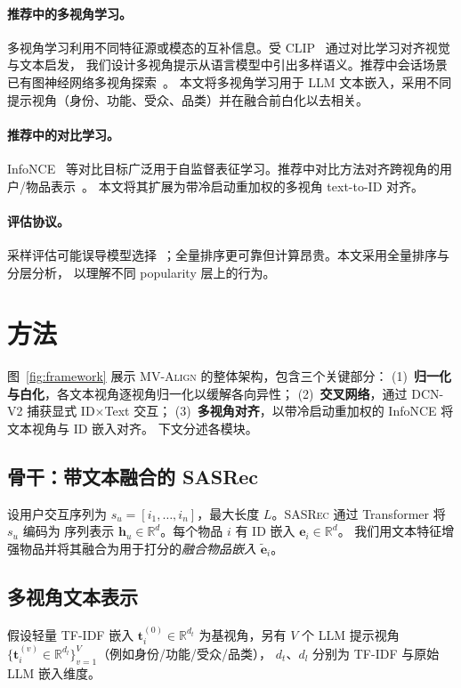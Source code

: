 \documentclass[sigconf,natbib=true,anonymous]{acmart}
\newcommand{\model}{\textsc{MV-Align}\xspace}
\newcommand{\base}{\textsc{SASRec}\xspace}
\newcommand{\tfidf}{\textsc{TF-IDF}\xspace}
\newcommand{\llm}{\textsc{LLM}\xspace}
\newcommand{\InfoNCE}{InfoNCE\xspace}
\newcommand{\slashbreak}{/\allowbreak{}}
\begin{document}
\paragraph{推荐中的多视角学习。}
多视角学习利用不同特征源或模态的互补信息。受 CLIP~\cite{radford2021clip} 通过对比学习对齐视觉与文本启发，
我们设计多视角提示从语言模型中引出多样语义。推荐中会话场景已有图神经网络多视角探索~\cite{huang2025mvcgnn_session}。
本文将多视角学习用于 \llm 文本嵌入，采用不同提示视角（身份、功能、受众、品类）并在融合前白化以去相关。

\paragraph{推荐中的对比学习。}
\InfoNCE~\cite{oord2018cpc} 等对比目标广泛用于自监督表征学习。推荐中对比方法对齐跨视角的用户/物品表示~\cite{wu2021cl4rec}。
本文将其扩展为带冷启动重加权的多视角 text-to-ID 对齐。

\paragraph{评估协议。}
采样评估可能误导模型选择~\cite{krichene2020sampledmetrics}；全量排序更可靠但计算昂贵。本文采用全量排序与分层分析，
以理解不同 popularity 层上的行为。


\section{方法}
图~\ref{fig:framework} 展示 \model 的整体架构，包含三个关键部分：
(1)~\textbf{归一化与白化}，各文本视角逐视角归一化以缓解各向异性；
(2)~\textbf{交叉网络}，通过 DCN-V2 捕获显式 ID$\times$Text 交互；
(3)~\textbf{多视角对齐}，以带冷启动重加权的 InfoNCE 将文本视角与 ID 嵌入对齐。
下文分述各模块。

\subsection{骨干：带文本融合的 SASRec}
设用户交互序列为 $s_u = [i_1,\dots,i_n]$，最大长度 $L$。\base 通过 Transformer 将 $s_u$ 编码为
序列表示 $\mathbf{h}_u \in \mathbb{R}^d$。每个物品 $i$ 有 ID 嵌入 $\mathbf{e}_i \in \mathbb{R}^d$。
我们用文本特征增强物品并将其融合为用于打分的\emph{融合物品嵌入} $\tilde{\mathbf{e}}_i$。

\subsection{多视角文本表示}\label{sec:whiten}
假设轻量 \tfidf 嵌入 $\mathbf{t}_i^{(0)} \in \mathbb{R}^{d_t}$ 为基视角，另有 $V$ 个 \llm 提示视角
$\{\mathbf{t}_i^{(v)} \in \mathbb{R}^{d_l}\}_{v=1}^V$（例如身份\slashbreak{}功能\slashbreak{}受众\slashbreak{}品类），
$d_t$、$d_l$ 分别为 \tfidf 与原始 \llm 嵌入维度。
\end{document}
